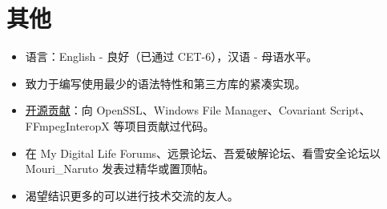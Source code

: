 \documentclass{resume}
\begin{document}
\section{其他}
\begin{itemize}

  \item 语言：English - 良好（已通过 CET-6），汉语 - 母语水平。

  \item 致力于编写使用最少的语法特性和第三方库的紧凑实现。

  \item \href{https://github.com/search?q=is%3Apr+author%3AMouriNaruto&type=Issues}{开源贡献}：向 OpenSSL、Windows File Manager、Covariant Script、FFmpegInteropX 等项目贡献过代码。
  
  \item 在 My Digital Life Forums、远景论坛、吾爱破解论坛、看雪安全论坛以 Mouri\_Naruto 发表过精华或置顶帖。
  
  \item 渴望结识更多的可以进行技术交流的友人。
  
\end{itemize}
\end{document}
